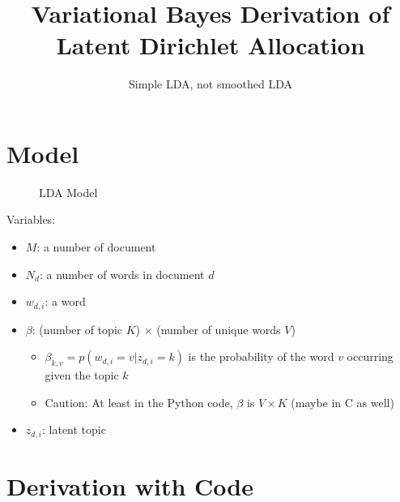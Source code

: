 \documentclass[a4paper,10.5pt,dvipdfmx]{jarticle}  %
\def\tightlist{
	\itemsep1pt
	\parskip1pt
	\parsep1pt
	\itemindent20pt
}
\begin{document}
\title{Variational Bayes Derivation of Latent Dirichlet Allocation}
\author{Simple LDA, not smoothed LDA}
\maketitle

\tableofcontents

\section{Model}
\begin{figure}[H]
\centering
{}
\caption{LDA Model}
\end{figure}
Variables:
\begin{itemize}
	\tightlist
	\item $M$: a number of document
	\item $N_d$: a number of words in document $d$
	\item $w_{d,i}$: a word
	\item $\beta$: (number of topic $K$) $\times$ (number of unique words $V$)
		\begin{itemize}
				\tightlist
			\item $\beta_{k,v} = p(w_{d,i} = v|z_{d,i}=k)$ is the probability of the word $v$ occurring given the topic $k$
			\item Caution: At least in the Python code, $\beta$ is $V \times K$ (maybe in C as well)
		\end{itemize}
	\item $z_{d,i}$: latent topic
\end{itemize}

\section{Derivation with Code}
\end{document}
